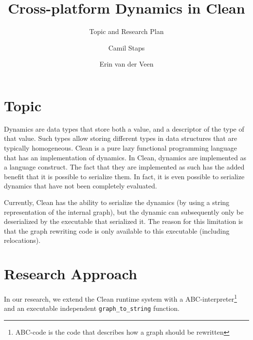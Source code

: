 \documentclass{scrartcl}
\title{Cross-platform Dynamics in Clean}
\subtitle{Topic and Research Plan}
\author[1]{Camil Staps}
\author[1]{Erin van der Veen}
\affil[1]{Radboud University Nijmegen}
\begin{document}
\maketitle

\section{Topic}
Dynamics are data types that store both a value, and a descriptor of the type of that value.
Such types allow storing different types in data structures that are typically homogeneous.
Clean is a pure lazy functional programming language that has an implementation of dynamics.
In Clean, dynamics are implemented as a language construct.
The fact that they are implemented as such has the added benefit that it is possible to serialize them.
In fact, it is even possible to serialize dynamics that have not been completely evaluated.

Currently, Clean has the ability to serialize the dynamics (by using a string representation of the internal graph), but the dynamic can subsequently only be deserialized by the executable that serialized it.
The reason for this limitation is that the graph rewriting code is only available to this executable (including relocations).

\section{Research Approach}
In our research, we extend the Clean runtime system with a ABC-interpreter\footnote{ABC-code is the code that describes how a graph should be rewritten} and an executable independent \texttt{graph\_to\_string} function.
\end{document}
